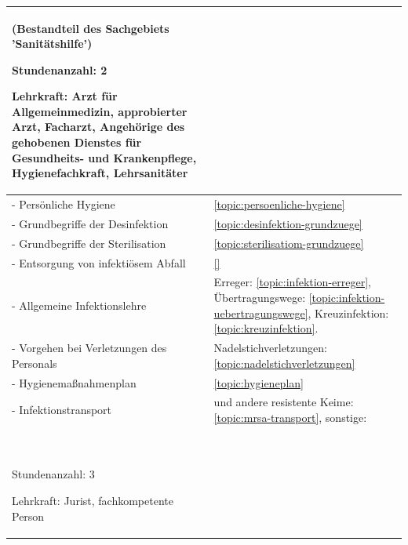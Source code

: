 \begin{xtabular}{p{10cm}p{5cm}}
(Bestandteil des Sachgebiets 'Sanitätshilfe') 

\begin{inparadesc}
\item[Stundenanzahl:] 2
\item[Lehrkraft:] Arzt für Allgemeinmedizin, approbierter Arzt,
Facharzt, Angehörige des gehobenen Dienstes für Gesundheits- und Krankenpflege,
Hygienefachkraft,  Lehrsanitäter
\end{inparadesc}

\\\midrule
- Persönliche Hygiene      
& 
\ref{topic:persoenliche-hygiene}
\\
- Grundbegriffe der Desinfektion             
& 
\ref{topic:desinfektion-grundzuege}
\\
- Grundbegriffe der  Sterilisation         
& 
\ref{topic:sterilisatiom-grundzuege}
\\
- Entsorgung von infektiösem Abfall       
& 
\ref{}\noindent{}
\\
- Allgemeine Infektionslehre          
& 
Erreger: \ref{topic:infektion-erreger}, Übertragungswege:
\ref{topic:infektion-uebertragungswege}, Kreuzinfektion:
\ref{topic:kreuzinfektion}.
\\
- Vorgehen bei Verletzungen des Personals                
& 
Nadelstichverletzungen: \ref{topic:nadelstichverletzungen}
\\
- Hygienemaßnahmenplan     
& 
\ref{topic:hygieneplan}
\\
- Infektionstransport      
& 
 und andere resistente Keime: \ref{topic:mrsa-transport},
sonstige: \noindent{} \\\toprule
{}  ~



\begin{inparadesc}
\item[Stundenanzahl:] 3
\item[Lehrkraft:]  Jurist, fachkompetente Person
\end{inparadesc}

\\\midrule


\end{xtabular}
